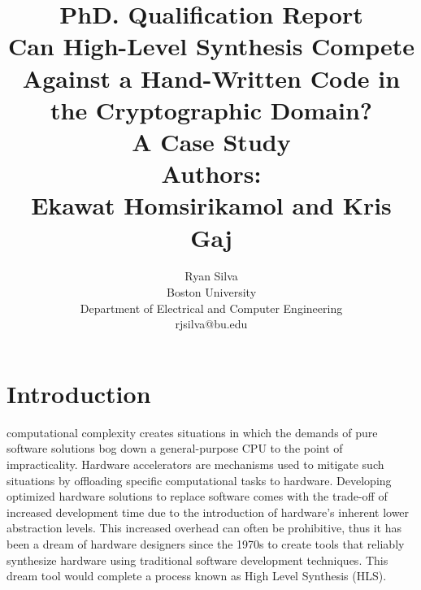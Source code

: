 \documentclass[11pt,journal,compsoc, onecolumn]{IEEEtran}
\begin{document}
\title{PhD. Qualification Report \\ \LARGE{\textbf{Can High-Level Synthesis Compete Against a Hand-Written Code in the Cryptographic Domain? \\ A Case Study \cite{sel}}} \\ Authors: \\ Ekawat Homsirikamol and Kris Gaj}

\author{Ryan Silva \\ Boston University \\ Department of Electrical and Computer Engineering \\ rjsilva@bu.edu
}


\maketitle


\IEEEdisplaynontitleabstractindextext
\IEEEpeerreviewmaketitle

\section{Introduction}
 computational complexity creates situations in which the demands of pure software solutions bog down a general-purpose CPU to the point of impracticality\cite{skalicky}. Hardware accelerators are mechanisms used to mitigate such situations by offloading specific computational tasks to hardware. Developing optimized hardware solutions to replace software comes with the trade-off of increased development time due to the introduction of hardware's inherent lower abstraction levels. This increased overhead can often be prohibitive, thus it has been a dream of hardware designers since the 1970s to create tools that reliably synthesize hardware using traditional software development techniques\cite{1}. This dream tool would complete a process known as High Level Synthesis (HLS).
\end{document}

